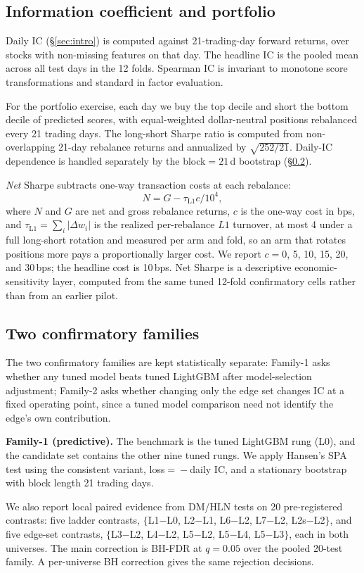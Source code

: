 \documentclass[sigconf,nonacm]{acmart}
\begin{document}
\subsection{Information coefficient and portfolio}
Daily IC (\S\ref{sec:intro}) is computed against 21-trading-day forward returns, over stocks with non-missing features on that day. The headline IC is the pooled mean across all test days in the 12 folds. Spearman IC is invariant to monotone score transformations and standard in factor evaluation.

For the portfolio exercise, each day we buy the top decile and short the bottom decile of predicted scores, with equal-weighted dollar-neutral positions rebalanced every 21 trading days. The long-short Sharpe ratio is computed from non-overlapping 21-day rebalance returns and annualized by $\sqrt{252/21}$. Daily-IC dependence is handled separately by the block${}=21$\,d bootstrap (\S\ref{sec:families}).

\emph{Net} Sharpe subtracts one-way transaction costs at each rebalance:
\[
N=G-\tau_{\text{L1}}c/10^4,
\]
where $N$ and $G$ are net and gross rebalance returns, $c$ is the one-way cost in bps, and $\tau_{\text{L1}}=\sum_i|\Delta w_i|$ is the realized per-rebalance $L1$ turnover, at most 4 under a full long-short rotation and measured per arm and fold, so an arm that rotates positions more pays a proportionally larger cost. We report $c=$0, 5, 10, 15, 20, and 30\,bps; the headline cost is 10\,bps. Net Sharpe is a descriptive economic-sensitivity layer, computed from the same tuned 12-fold confirmatory cells rather than from an earlier pilot.

\subsection{Two confirmatory families}\label{sec:families}
The two confirmatory families are kept statistically separate: Family-1 asks whether any tuned model beats tuned LightGBM after model-selection adjustment; Family-2 asks whether changing only the edge set changes IC at a fixed operating point, since a tuned model comparison need not identify the edge's own contribution.

\textbf{Family-1 (predictive).} The benchmark is the tuned LightGBM rung (L0), and the candidate set contains the other nine tuned rungs. We apply Hansen's SPA test using the consistent variant, loss${}={}-$daily IC, and a stationary bootstrap with block length 21 trading days.

We also report local paired evidence from DM/HLN tests on 20 pre-registered contrasts: five ladder contrasts, $\{$L1$-$L0, L2$-$L1, L6$-$L2, L7$-$L2, L2s$-$L2$\}$, and five edge-set contrasts, $\{$L3$-$L2, L4$-$L2, L5$-$L2, L5$-$L4, L5$-$L3$\}$, each in both universes. The main correction is BH-FDR at $q=0.05$ over the pooled 20-test family. A per-universe BH correction gives the same rejection decisions.
\end{document}
